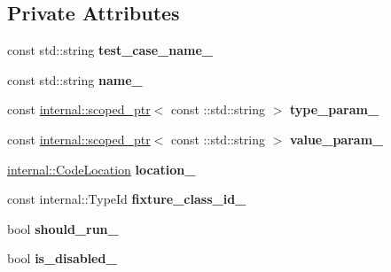 \subsection*{Private Attributes}
\begin{DoxyCompactItemize}
\item 
\mbox{\label{classtesting_1_1_test_info_a3dcf626bbfc3756103be329c05377a5f}} 
const std\+::string {\bfseries test\+\_\+case\+\_\+name\+\_\+}
\item 
\mbox{\label{classtesting_1_1_test_info_a6bed52b7c3d66c8c5eac5fa2aaadba55}} 
const std\+::string {\bfseries name\+\_\+}
\item 
\mbox{\label{classtesting_1_1_test_info_ab4f53cfaf59e1b5cac858a9322697e88}} 
const \hyperlink{classtesting_1_1internal_1_1scoped__ptr}{internal\+::scoped\+\_\+ptr}$<$ const \+::std\+::string $>$ {\bfseries type\+\_\+param\+\_\+}
\item 
\mbox{\label{classtesting_1_1_test_info_ac3dd68ea96ebe82c6eab31e6e730a918}} 
const \hyperlink{classtesting_1_1internal_1_1scoped__ptr}{internal\+::scoped\+\_\+ptr}$<$ const \+::std\+::string $>$ {\bfseries value\+\_\+param\+\_\+}
\item 
\mbox{\label{classtesting_1_1_test_info_a749494420174e6cf1949c7b411e8df6f}} 
\hyperlink{structtesting_1_1internal_1_1_code_location}{internal\+::\+Code\+Location} {\bfseries location\+\_\+}
\item 
\mbox{\label{classtesting_1_1_test_info_ad3284b7b9ebe61cc31440694091450ae}} 
const internal\+::\+Type\+Id {\bfseries fixture\+\_\+class\+\_\+id\+\_\+}
\item 
\mbox{\label{classtesting_1_1_test_info_a89c3d8fb8b565532c34d3123240fd5cf}} 
bool {\bfseries should\+\_\+run\+\_\+}
\item 
\mbox{\label{classtesting_1_1_test_info_af3765fc4f811296e0699b0a26430a7c7}} 
bool {\bfseries is\+\_\+disabled\+\_\+}
\item 
\mbox{\label{classtesting_1_1_test_info_a397686f82b6dd68a209ab7b50eeb4932}} 

\end{DoxyCompactItemize}
